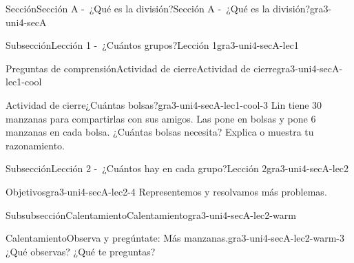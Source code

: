 \documentclass[twoside,10pt,]{article}
\begin{document}
\begin{sectionptx}{Sección}{Sección A -~¿Qué es la división?}{}{Sección A -~¿Qué es la división?}{}{}{gra3-uni4-secA}
\begin{subsectionptx}{Subsección}{Lección 1 -~¿Cuántos grupos?}{}{Lección 1}{}{}{gra3-uni4-secA-lec1}
\typeout{************************************************}
%
\begin{reading-questions-subsubsection}{Preguntas de comprensión}{Actividad de cierre}{}{Actividad de cierre}{}{}{gra3-uni4-secA-lec1-cool}
\begin{project}{Actividad de cierre}{¿Cuántas bolsas?}{gra3-uni4-secA-lec1-cool-3}%
Lin tiene 30 manzanas para compartirlas con sus amigos. Las pone en bolsas y pone 6 manzanas en cada bolsa. ¿Cuántas bolsas necesita? Explica o muestra tu razonamiento.%
\end{project}%
\end{reading-questions-subsubsection}
\end{subsectionptx}
%
%
\typeout{************************************************}
\typeout{************************************************}
%
\begin{subsectionptx}{Subsección}{Lección 2 -~¿Cuántos hay en cada grupo?}{}{Lección 2}{}{}{gra3-uni4-secA-lec2}
\begin{objectives}{Objetivos}{gra3-uni4-secA-lec2-4}
Representemos y resolvamos más problemas.%
\end{objectives}
%
%
\typeout{************************************************}
\typeout{************************************************}
%
\begin{subsubsectionptx}{Subsubsección}{Calentamiento}{}{Calentamiento}{}{}{gra3-uni4-secA-lec2-warm}
\begin{exploration}{Calentamiento}{Observa y pregúntate: Más manzanas.}{gra3-uni4-secA-lec2-warm-3}%
¿Qué observas? ¿Qué te preguntas?%
\begin{image}{0}{1}{0}{}%

\end{image}
\end{exploration}
\end{subsubsectionptx}
\end{subsectionptx}
\end{sectionptx}
\end{document}
